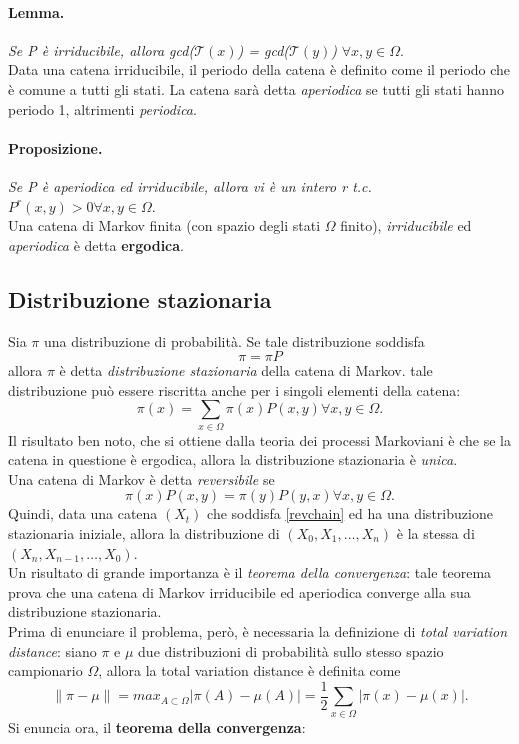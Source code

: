 \paragraph{Lemma.} \textit{Se P è irriducibile, allora gcd($\mathcal{T}(x)$) = gcd($\mathcal{T}(y)$)} $\forall x, y \in \Omega$.\\
Data una catena irriducibile, il periodo della catena è definito come il periodo che è comune a tutti gli stati. La catena sarà detta \textit{aperiodica} se tutti gli stati hanno periodo 1, altrimenti \textit{periodica}.
\paragraph{Proposizione.} \textit{Se P è aperiodica ed irriducibile, allora vi è un intero r t.c.} $P^r(x, y) > 0 \forall x, y \in \Omega$.\\
Una catena di Markov finita (con spazio degli stati $\Omega$ finito), \textit{irriducibile} ed \textit{aperiodica} è detta \textbf{ergodica}.
\subsection{Distribuzione stazionaria}\label{ssec:stazdist}
Sia $\pi$ una distribuzione di probabilità. Se tale distribuzione soddisfa
\begin{equation}
	\pi = \pi P
\end{equation}
allora $\pi$ è detta \textit{distribuzione stazionaria} della catena di Markov. tale distribuzione può essere riscritta anche per i singoli elementi della catena:
\begin{equation}
	\pi(x) = \sum_{x\in \Omega}{\pi(x)P(x, y)} \forall x,y \in \Omega.
\end{equation}
Il risultato ben noto, che si ottiene dalla teoria dei processi Markoviani è che se la catena in questione è ergodica, allora la distribuzione stazionaria è \textit{unica}.\\
Una catena di Markov è detta \textit{reversibile} se
\begin{equation}
	\pi(x)P(x,y) = \pi(y)P(y,x) \forall x,y \in \Omega.
	\label{revchain}
\end{equation}
Quindi, data una catena $(X_t)$ che soddisfa \ref{revchain} ed ha una distribuzione stazionaria iniziale, allora la distribuzione di $(X_0, X_1, \dots, X_n)$ è la stessa di $(X_n, X_{n-1}, \dots, X_0)$.\\
Un risultato di grande importanza è il \textit{teorema della convergenza}: tale teorema prova che una catena di Markov irriducibile ed aperiodica converge alla sua distribuzione stazionaria.\\
Prima di enunciare il problema, però, è necessaria la definizione di \textit{total variation distance}: siano $\pi$ e $\mu$ due distribuzioni di probabilità sullo stesso spazio campionario $\Omega$, allora la total variation distance è definita come
\begin{equation}
	\|\pi - \mu\| = max_{A\subset\Omega}|\pi(A) - \mu(A)| = \frac{1}{2}\sum_{x\in\Omega}{|\pi(x) - \mu(x)|}.
\end{equation}
Si enuncia ora, il \textbf{teorema della convergenza}:
